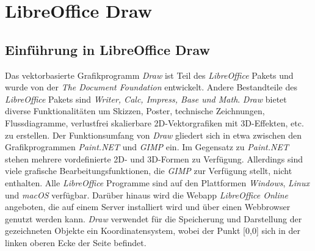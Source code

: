 
\section{LibreOffice Draw}

\subsection{Einführung in LibreOffice Draw}
\hon{}
Das vektorbasierte Grafikprogramm \textit{Draw} ist Teil des \textit{LibreOffice} Pakets und wurde von der \textit{The Document Foundation} entwickelt. Andere Bestandteile des \textit{LibreOffice} Pakets sind \textit{Writer, Calc, Impress, Base und Math}. \textit{Draw} bietet diverse Funktionalitäten um Skizzen, Poster, technische Zeichnungen, Flussdiagramme, verlustfrei skalierbare 2D-Vektorgrafiken mit 3D-Effekten, etc. zu erstellen. 
Der Funktionsumfang von \textit{Draw} gliedert sich in etwa zwischen den Grafikprogrammen \textit{Paint.NET} und \textit{GIMP} ein. Im Gegensatz zu \textit{Paint.NET} stehen mehrere vordefinierte 2D- und 3D-Formen zu Verfügung. Allerdings sind viele grafische Bearbeitungsfunktionen, die \textit{GIMP} zur Verfügung stellt, nicht enthalten. Alle \textit{LibreOffice} Programme sind auf den Plattformen \textit{Windows}, \textit{Linux} und \textit{macOS} verfügbar. Darüber hinaus wird die Webapp \textit{LibreOffice Online} angeboten, die auf einem Server installiert wird und über einen Webbrowser genutzt werden kann.
\textit{Draw} verwendet für die Speicherung und Darstellung der gezeichneten Objekte ein Koordinatensystem, wobei der Punkt [0,0] sich in der linken oberen Ecke der Seite befindet.
\footnotemark[30]
\footnotemark[31]

